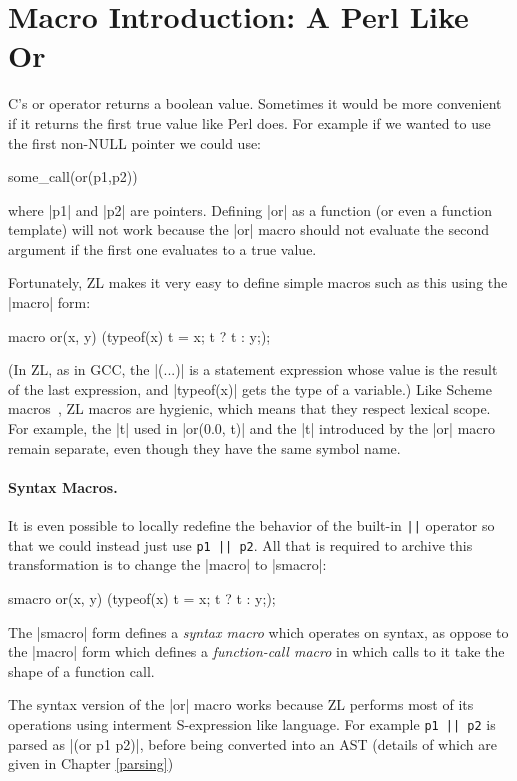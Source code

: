 \section{Macro Introduction: A Perl Like Or}
\label{pattern-macros}

C's or operator returns a boolean value.  Sometimes it would be more
convenient if it returns the first true value like Perl does.  For
example if we wanted to use the first non-NULL pointer we could use:
\begin{code}
some_call(or(p1,p2))
\end{code}
where |p1| and |p2| are pointers.  Defining |or| as a function (or even
a function template) will not work because the |or| macro should not
evaluate the second argument if the first one evaluates to a true
value.

Fortunately, ZL makes it very easy to define simple macros such as this
using the |macro| form:
\label{or}
\begin{code}
macro or(x, y) { ({typeof(x) t = x; t ? t : y;}); }
\end{code}
(In ZL, as in GCC, the |({...})| is a statement expression whose value
is the result of the last expression, and |typeof(x)| gets the type of
a variable.)  Like Scheme macros~\cite{syn-abst}, ZL macros
are hygienic, which means that they respect lexical scope.  For
example, the |t| used in |or(0.0, t)| and the |t| introduced by the
|or| macro remain separate, even though they have the same symbol
name.

\paragraph{Syntax Macros.}

It is even possible to locally redefine the behavior of the built-in
\verb/||/ operator so that we could instead just use \verb/p1 || p2/.
All that is required to archive this transformation is to change the
|macro| to |smacro|:
\begin{code}
smacro or(x, y) { ({typeof(x) t = x; t ? t : y;}); }
\end{code}
The |smacro| form defines a \textit{syntax macro} which operates on
syntax, as oppose to the |macro| form which defines a \textit{function-call
  macro} in which calls to it take the shape of a function call.

The syntax version of the |or| macro works because ZL performs most of
its operations using interment S-expression like language.  For
example \verb/p1 || p2/ is parsed as |(or p1 p2)|, before being
converted into an AST (details of which are given in Chapter
\ref{parsing})

